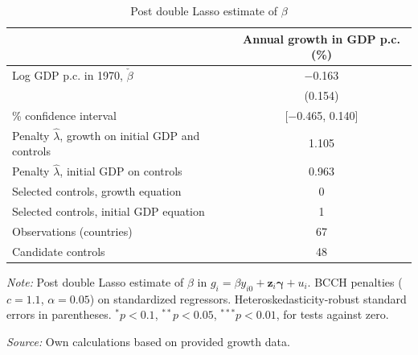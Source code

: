 \begin{table}[!htbp]
\centering
\caption{Post double Lasso estimate of $\beta$}
\label{tab:pdl_estimates}
\begin{threeparttable}
\begin{tabular}{lc}
\toprule
 & Annual growth in GDP p.c. (\%) \\
\midrule
Log GDP p.c. in 1970, $\check{\beta}$ & $-$0.163 \\
 & (0.154) \\
\addlinespace
95\% confidence interval & [$-$0.465, 0.140] \\
\midrule
Penalty $\hat{\lambda}$, growth on initial GDP and controls & 1.105 \\
Penalty $\hat{\lambda}$, initial GDP on controls & 0.963 \\
Selected controls, growth equation & 0 \\
Selected controls, initial GDP equation & 1 \\
\midrule
Observations (countries) & 67 \\
Candidate controls & 48 \\
\bottomrule
\end{tabular}
\begin{tablenotes}[flushleft]
\footnotesize
\item \textit{Note:} Post double Lasso estimate of $\beta$ in $g_i = \beta y_{i0} + \mathbf{z}_i\boldsymbol{\gamma} + u_i$. BCCH penalties ($c=1.1$, $\alpha=0.05$) on standardized regressors. Heteroskedasticity-robust standard errors in parentheses. $^{*}p<0.1$, $^{**}p<0.05$, $^{***}p<0.01$, for tests against zero.
\item \textit{Source:} Own calculations based on provided growth data.
\end{tablenotes}
\end{threeparttable}
\end{table}